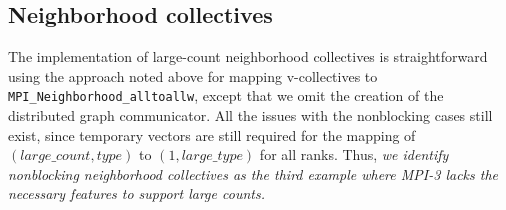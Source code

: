 
\subsection{Neighborhood collectives}


The implementation of large-count neighborhood collectives is straightforward
using the approach noted above for mapping v-collectives to \texttt{MPI\_Neighborhood\_alltoallw},
except that we omit the creation of the distributed graph communicator.
All the issues with the nonblocking cases still exist, since temporary vectors
are still required for the mapping of $(large\_count,type)$ to $(1,large\_type)$ for all ranks.
Thus, \textit{we identify nonblocking neighborhood collectives as the third example
where MPI-3 lacks the necessary features to support large counts.}
